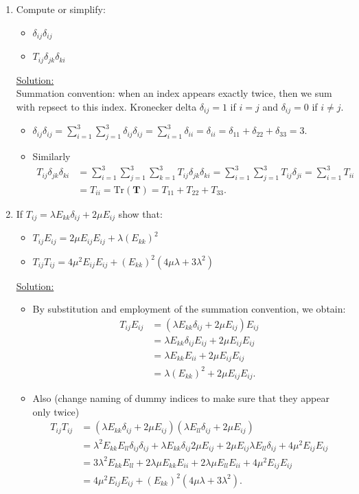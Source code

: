 \documentclass{article}
\newcommand{\ee}{\end{equation}}
\newcommand{\be}{\begin{equation}}
\newcommand{\bi}{\begin{itemize}}
\newcommand{\ei}{\end{itemize}}
\newcommand{\bs}{\boldsymbol}
\begin{document}
\begin{enumerate}
\item Compute or simplify:
\bi
\item $\delta_{ij}\delta_{ij}$
\item $T_{ij}\delta_{jk}\delta_{ki}$
\ei
%

\underline{Solution:} \\
 Summation convention: when an index appears exactly twice, then we sum with repsect to this index. Kronecker delta $\delta_{ij}=1$ if $i=j$ and
 $\delta_{ij}=0$ if $i\ne j$.
\bi
\item $\delta_{ij}\delta_{ij}=\sum_{i=1}^3 \sum_{j=1}^3 \delta_{ij}\delta_{ij}=\sum_{i=1}^3 \delta_{ii}=\delta_{ii}=\delta_{11}+\delta_{22}+\delta_{33}=3$.
\item Similarly
\begin{align}
T_{ij}\delta_{jk}\delta_{ki} &= \sum_{i=1}^3\sum_{j=1}^3 \sum_{k=1}^3 T_{ij}\delta_{jk}\delta_{ki}=\sum_{i=1}^3\sum_{j=1}^3  T_{ij}\delta_{ji} = \sum_{i=1}^3
T_{ii} \\ \nonumber
&= T_{ii} = \textrm{Tr}(\bs T) = T_{11}+T_{22}+T_{33}.
\end{align}
\ei


%
\item If $ T_{ij} =\lambda E_{kk}\delta_{ij}+2\mu E_{ij}$ show that:
\bi
\item $T_{ij} E_{ij}=2\mu E_{ij}E_{ij}+\lambda (E_{kk})^2$
\item $T_{ij} T_{ij}= 4\mu ^2 E_{ij} E_{ij}+ (E_{kk})^2 (4\mu \lambda+3\lambda^2)$ 
\ei
%
\underline{Solution:} \\
\bi
\item By substitution and employment of the summation convention, we obtain:
\be
\begin{array}{ll}
 T_{ij} E_{ij} &=(\lambda E_{kk}\delta_{ij}+2\mu E_{ij})E_{ij} \\
 &= \lambda E_{kk} \delta_{ij}E_{ij}+2\mu E_{ij} E_{ij} \\
 &= \lambda E_{kk} E_{ii}+ 2\mu E_{ij} E_{ij} \\
 &=\lambda(E_{kk})^2+ 2\mu E_{ij} E_{ij}.
\end{array}
\ee
\item Also (change naming of dummy indices to make sure that they appear only twice)
\be
\begin{array}{ll}
 T_{ij} T_{ij} &=(\lambda E_{kk}\delta_{ij}+2\mu E_{ij})(\lambda E_{ll}\delta_{ij}+2 \mu E_{ij}) \\
 &= \lambda^2 E_{kk} E_{ll} \delta_{ij}\delta_{ij}+\lambda E_{kk}\delta_{ij}2 \mu E_{ij}+
 2\mu E_{ij}\lambda E_{ll}\delta_{ij}+4\mu^2 E_{ij} E_{ij} \\
  &= 3 \lambda^2 E_{kk} E_{ll} + 2\lambda \mu E_{kk} E_{ii} +2\lambda \mu E_{ll} E_{ii}+ 4\mu^2 E_{ij} E_{ij}  \\
 &=4\mu ^2 E_{ij} E_{ij}+ (E_{kk})^2 (4\mu \lambda+3\lambda^2).
\end{array}
\ee
\ei


\end{enumerate}
\end{document}
